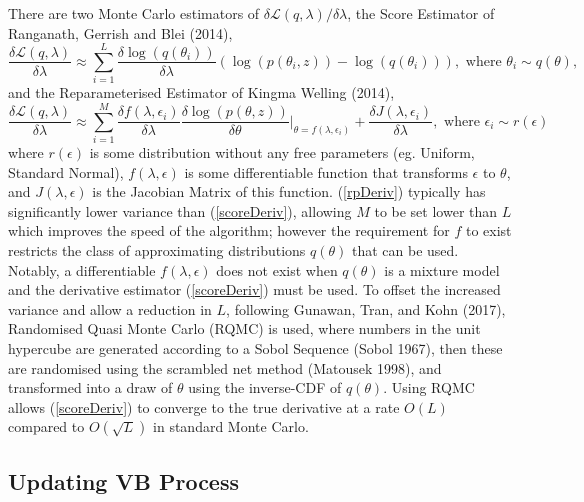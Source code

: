 \documentclass[12pt,a4paper]{article}\usepackage[]{graphicx}\usepackage[]{color}
\begin{document}
There are two Monte Carlo estimators of $\delta\mathcal{L}(q, \lambda) / \delta \lambda$, the Score Estimator of Ranganath, Gerrish and Blei (2014), 
\begin{equation}
\label{scoreDeriv}
\frac{\delta\mathcal{L}(q, \lambda)}{\delta \lambda} \approx \sum_{i = 1}^L \frac{\delta \log(q(\theta_i))}{\delta \lambda} \left(\log(p(\theta_i, z)) - \log(q(\theta_i)) \right), \mbox{ where } \theta_i \sim q(\theta),
\end{equation}
and the Reparameterised Estimator of Kingma Welling (2014),
\begin{equation}
\label{rpDeriv}
\frac{\delta\mathcal{L}(q, \lambda)}{\delta \lambda} \approx \sum_{i = 1}^M \frac{\delta f(\lambda, \epsilon_i)}{\delta \lambda} \frac{\delta \log(p(\theta, z))}{\delta \theta} \bigg\rvert_{\theta = f(\lambda, \epsilon_i)} + \frac{\delta J(\lambda, \epsilon_i)}{\delta \lambda}, \mbox{ where } \epsilon_i \sim r(\epsilon)
\end{equation}
where $r(\epsilon)$ is some distribution without any free parameters (eg. Uniform, Standard Normal), $f(\lambda, \epsilon)$ is some differentiable function that transforms $\epsilon$ to $\theta$, and $J(\lambda, \epsilon)$ is the Jacobian Matrix of this function. (\ref{rpDeriv}) typically has significantly lower variance than (\ref{scoreDeriv}), allowing $M$ to be set lower than $L$ which improves the speed of the algorithm; however the requirement for $f$ to exist restricts the class of approximating distributions $q(\theta)$ that can be used.
Notably, a differentiable $f(\lambda, \epsilon)$ does not exist when $q(\theta)$ is a mixture model and the derivative estimator (\ref{scoreDeriv}) must be used. To offset the increased variance and allow a reduction in $L$, following Gunawan, Tran, and Kohn (2017), Randomised Quasi Monte Carlo (RQMC) is used, where numbers in the unit hypercube are generated according to a Sobol Sequence (Sobol 1967), then these are randomised using the scrambled net method (Matousek 1998), and transformed into a draw of $\theta$ using the inverse-CDF of $q(\theta)$. Using RQMC allows (\ref{scoreDeriv}) to converge to the true derivative at a rate $O(L)$ compared to $O(\sqrt{L})$ in standard Monte Carlo. 

\subsection{Updating VB Process}
\end{document}
